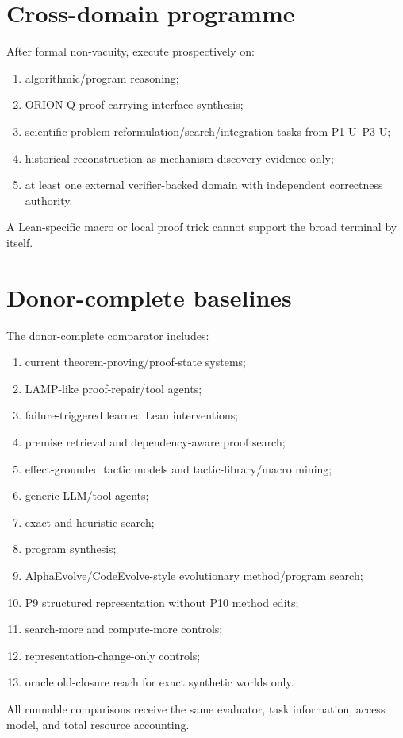 \documentclass[11pt]{article}
\begin{document}
\section{Cross-domain programme}
After formal non-vacuity, execute prospectively on:
\begin{enumerate}
    \item algorithmic/program reasoning;
    \item ORION-Q proof-carrying interface synthesis;
    \item scientific problem reformulation/search/integration tasks from P1-U--P3-U;
    \item historical reconstruction as mechanism-discovery evidence only;
    \item at least one external verifier-backed domain with independent correctness authority.
\end{enumerate}
A Lean-specific macro or local proof trick cannot support the broad terminal by itself.

\section{Donor-complete baselines}
The donor-complete comparator includes:
\begin{enumerate}
    \item current theorem-proving/proof-state systems;
    \item LAMP-like proof-repair/tool agents;
    \item failure-triggered learned Lean interventions;
    \item premise retrieval and dependency-aware proof search;
    \item effect-grounded tactic models and tactic-library/macro mining;
    \item generic LLM/tool agents;
    \item exact and heuristic search;
    \item program synthesis;
    \item AlphaEvolve/CodeEvolve-style evolutionary method/program search;
    \item P9 structured representation without P10 method edits;
    \item search-more and compute-more controls;
    \item representation-change-only controls;
    \item oracle old-closure reach for exact synthetic worlds only.
\end{enumerate}
All runnable comparisons receive the same evaluator, task information, access model, and total resource accounting.
\end{document}
